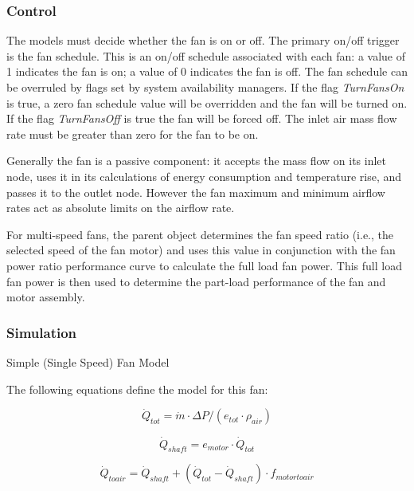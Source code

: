 \subsubsection{Control}\label{control}

The models must decide whether the fan is on or off. The primary on/off trigger is the fan schedule. This is an on/off schedule associated with each fan: a value of 1 indicates the fan is on; a value of 0 indicates the fan is off. The fan schedule can be overruled by flags set by system availability managers. If the flag \emph{TurnFansOn} is true, a zero fan schedule value will be overridden and the fan will be turned on. If the flag \emph{TurnFansOff} is true the fan will be forced off. The inlet air mass flow rate must be greater than zero for the fan to be on.

Generally the fan is a passive component: it accepts the mass flow on its inlet node, uses it in its calculations of energy consumption and temperature rise, and passes it to the outlet node. However the fan maximum and minimum airflow rates act as absolute limits on the airflow rate.

For multi-speed fans, the parent object determines the fan speed ratio (i.e., the selected speed of the fan motor) and uses this value in conjunction with the fan power ratio performance curve to calculate the full load fan power. This full load fan power is then used to determine the part-load performance of the fan and motor assembly.

\subsubsection{Simulation}\label{simulation}

Simple (Single Speed) Fan Model

The following equations define the model for this fan:

\begin{equation}
{\dot Q_{tot}} = \dot m\cdot \Delta P/({e_{tot}}\cdot {\rho_{air}})
\end{equation}

\begin{equation}
{\dot Q_{shaft}} = {e_{motor}}\cdot {\dot Q_{tot}}
\end{equation}

\begin{equation}
{\dot Q_{toair}} = {\dot Q_{shaft}} + ({\dot Q_{tot}} - {\dot Q_{shaft}})\cdot {f_{motortoair}}
\end{equation}


